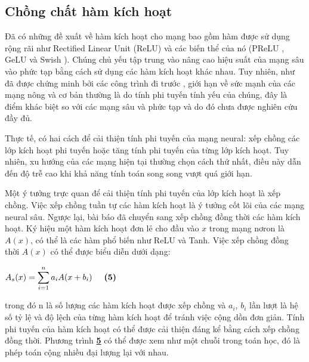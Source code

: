 \documentclass[a4paper,12pt]{article}
\begin{document}
\subsection{Chồng chất hàm kích hoạt}
Đã có những đề xuất về hàm kích hoạt cho mạng bao gồm hàm được sử dụng rộng rãi như Rectified Linear Unit (ReLU) và các biến thể của nó (PReLU \cite{he2015delvingdeeprectifierssurpassing}, GeLU \cite{hendrycks2023gaussianerrorlinearunits} và Swish \cite{ramachandran2017searchingactivationfunctions}). Chúng chủ yếu tập trung vào nâng cao hiệu suất của mạng sâu vào phức tạp bằng cách sử dụng các hàm kích hoạt khác nhau. Tuy nhiên, như đã được chứng minh bởi các công trình đi trước \cite{mhaskar2016deepvsshallownetworks, eldan2016powerdepthfeedforwardneural, telgarsky2016benefitsdepthneuralnetworks}, giới hạn về sức mạnh của các mạng nông và cơ bản thường là do tính phi tuyến tính yếu của chúng, đây là điểm khác biệt so với các mạng sâu và phức tạp và do đó chưa được nghiên cứu đầy đủ.

Thực tế, có hai cách để cải thiện tính phi tuyến của mạng neural: xếp chồng các lớp kích hoạt phi tuyến hoặc tăng tính phi tuyến của từng lớp kích hoạt. Tuy nhiên, xu hướng của các mạng hiện tại thường chọn cách thứ nhất, điều này dẫn đến độ trễ cao khi khả năng tính toán song song vượt quá giới hạn.

Một ý tưởng trực quan để cải thiện tính phi tuyến của lớp kích hoạt là xếp chồng. Việc xếp chồng tuần tự các hàm kích hoạt là ý tưởng cốt lõi của các mạng neural sâu. Ngược lại, bài báo đã chuyển sang xếp chồng đồng thời các hàm kích hoạt. Ký hiệu một hàm kích hoạt đơn lẻ cho đầu vào $x$ trong mạng nơron là $A(x)$, có thể là các hàm phổ biến như ReLU và Tanh. Việc xếp chồng đồng thời $A(x)$ có thể được biểu diễn dưới dạng:
\begin{center}
    $A_s(x)=\displaystyle\sum^n_{i=1}a_iA(x+b_i) \hspace*{5mm} \textbf{(5)} \label{eq:activation}$
\end{center}
trong đó n là số lượng các hàm kích hoạt được xếp chồng và $a_i$, $b_i$ lần lượt là hệ số tỷ lệ và độ lệch của từng hàm kích hoạt để tránh việc cộng dồn đơn giản. Tính phi tuyến của hàm kích hoạt có thể được cải thiện đáng kể bằng cách xếp chồng đồng thời. Phương trình \textbf{\hyperref[eq:activation]{5}} có thể được xem như một chuỗi trong toán học, đó là phép toán cộng nhiều đại lượng lại với nhau.
\end{document}
